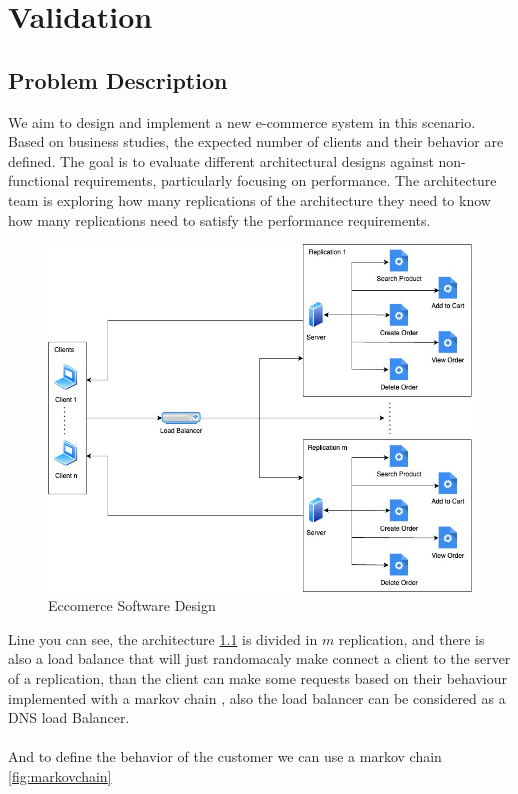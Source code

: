 \chapter{Validation}

\section{Problem Description }

We aim to design and implement a new e-commerce system in this scenario. Based on business studies, the expected number of clients and their behavior are defined. The goal is to evaluate different architectural designs against non-functional requirements, particularly focusing on performance. The architecture team is exploring how many replications of the architecture they need to know how many replications need to satisfy the performance requirements.

\begin{figure}[H]
    \centering
    \includegraphics[width=1\linewidth]{images/archEcom.jpg}
    \caption{Eccomerce Software Design}
    \label{fig:eds}
\end{figure}

Line you can see, the architecture \ref{fig:eds} is divided in $m$ replication, and there is also a load balance \cite{loadBalancer} that will just randomacaly make connect a client to the server of a replication, than the client can make some requests based on their behaviour implemented with a markov chain \cite{markovChain}, also the load balancer can be considered as a DNS load Balancer.
\\ \\
And to define the behavior of the customer we can use a markov chain \ref{fig:markovchain}

